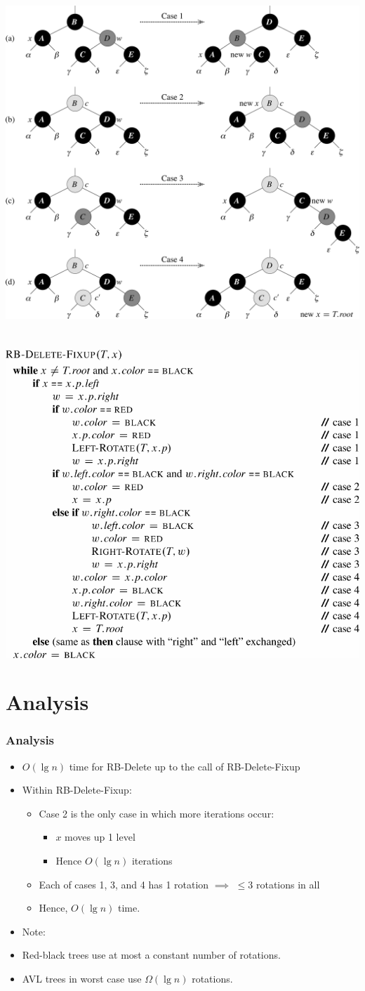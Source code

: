 \documentclass{beamer}
\newcommand{\bi}{\begin{itemize}}
\newcommand{\ii}{\item}
\newcommand{\ei}{\end{itemize}}
\newcommand{\sect}[1]{
\section{#1}
\begin{frame}[fragile]\frametitle{#1}
}
\begin{document}
\sect{}
\includegraphics[height=0.9\textheight]{Fig-13-7.pdf}
\end{frame}

\sect{}
\includegraphics[scale=0.8]{RB-Delete-Fixup}
\end{frame}

\sect{Analysis}
\bi
\ii $O(\lg n)$ time for {\sc RB-Delete} up to the call
of {\sc RB-Delete-Fixup}
\ii Within {\sc RB-Delete-Fixup}:
\bi
\ii Case 2 is the only case in which more iterations occur:
\bi
\ii $x$ moves up 1 level
\ii Hence $O(\lg n)$ iterations
\ei
\ii Each of cases 1, 3, and 4 has 1 rotation $\implies$
$\leq 3$ rotations in all
\ii Hence, $O(\lg n)$ time.
\ei
\ii Note:
\ii Red-black trees use at most a constant number of rotations.
\ii AVL trees in worst case use $\Omega(\lg n)$ rotations.
\ei
\end{frame}

\end{document}
